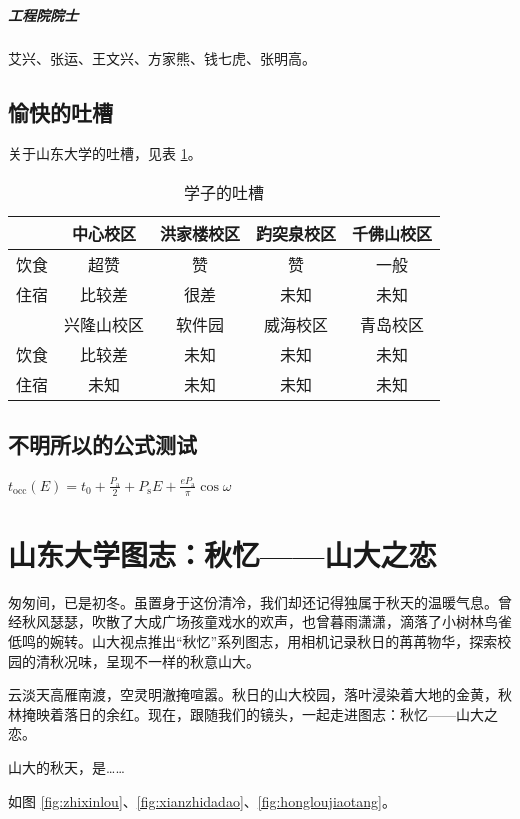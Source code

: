 \documentclass[openany]{sduthesis} %
\begin{document}
\paragraph{工程院院士}艾兴、张运、王文兴、方家熊、钱七虎、张明高。

\section{愉快的吐槽}

关于山东大学的吐槽，见表 \ref{tab:debunk}。

\begin{table}[!htb]
\centering
\caption{学子的吐槽}\label{tab:debunk}
\begin{tabular}{*5{c}}
  \toprule
  & 中心校区 & 洪家楼校区 & 趵突泉校区 & 千佛山校区 \\
  \midrule
  饮食 & 超赞 & 赞 & 赞 & 一般 \\
  住宿 & 比较差 & 很差 & 未知 & 未知\\
  \midrule[0.8pt]
  & 兴隆山校区 & 软件园 & 威海校区 & 青岛校区 \\
  \midrule
  饮食 & 比较差 & 未知 & 未知 & 未知 \\
  住宿 & 未知 & 未知 & 未知 & 未知\\
  \bottomrule
\end{tabular}
\end{table}

\section{不明所以的公式测试}
$t_{\mathrm{occ}}(E)=t_{0}+\frac{P_{\mathrm{a}}}{2}+P_{\mathrm{s}} E+\frac{e P_{\mathrm{a}}}{\pi} \cos \omega$


\chapter{山东大学图志：秋忆——山大之恋}

匆匆间，已是初冬。虽置身于这份清冷，我们却还记得独属于秋天的温暖气息。曾经秋风瑟瑟，吹散了大成广场孩童戏水的欢声，也曾暮雨潇潇，滴落了小树林鸟雀低鸣的婉转。山大视点推出“秋忆”系列图志，用相机记录秋日的苒苒物华，探索校园的清秋况味，呈现不一样的秋意山大。

云淡天高雁南渡，空灵明澈掩喧嚣。秋日的山大校园，落叶浸染着大地的金黄，秋林掩映着落日的余红。现在，跟随我们的镜头，一起走进图志：秋忆——山大之恋。

山大的秋天，是……

如图 \ref{fig:zhixinlou}、\ref{fig:xianzhidadao}、\ref{fig:hongloujiaotang}。
\end{document}
